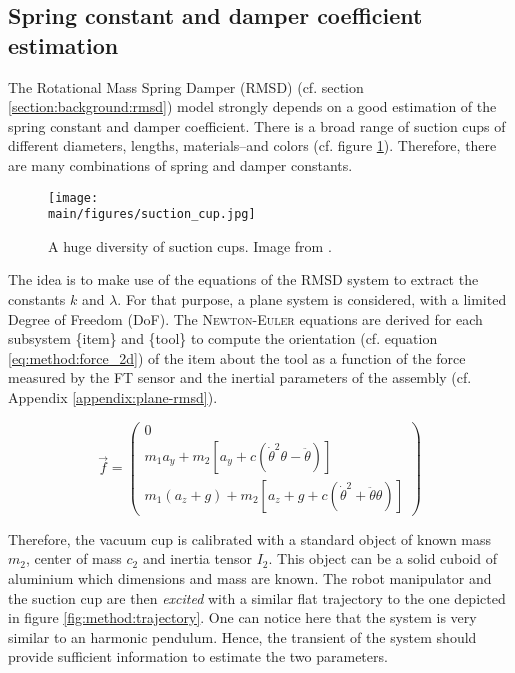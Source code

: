 \documentclass[/home/francois/latex/report/main.tex]{subfiles}
\begin{document}
\subsection{Spring constant and damper coefficient estimation}

The Rotational Mass Spring Damper (RMSD) (cf. section \ref{section:background:rmsd}) model strongly depends on a good estimation of the spring constant and damper coefficient. There is a broad range of suction cups of different diameters, lengths, materials–and colors (cf. figure \ref{fig:method:suction-cups}). Therefore, there are many combinations of spring and damper constants.

\begin{figure}[H]
  \centering
  \texttt{[image: \\main/figures/suction\_cup.jpg]}
  \caption{A huge diversity of suction cups. Image from \cite{Piab2020}.}
  \label{fig:method:suction-cups}
\end{figure}

The idea is to make use of the equations of the \ac{RMSD} system to extract the constants $k$ and $\lambda$. For that purpose, a plane system is considered, with a limited Degree of Freedom (DoF). The \textsc{Newton-Euler} equations are derived for each subsystem \{item\} and \{tool\} to compute the orientation (cf. equation \ref{eq:method:force_2d}) of the item about the tool as a function of the force measured by the \ac{FT} sensor and the inertial parameters of the assembly (cf. Appendix \ref{appendix:plane-rmsd}).

\begin{equation}
  \label{eq:method:force_2d}
  \overrightarrow{f}
  =
  \begin{pmatrix}
  0 \\
  m_1 a_y + m_2 [a_y + c (\dot{\theta}^2 \theta - \ddot{\theta})] \\
  m_1 (a_z + g) + m_2 [a_z + g + c (\dot{\theta}^2 + \ddot{\theta} \theta)]
  \end{pmatrix}
\end{equation}

Therefore, the vacuum cup is calibrated with a standard object of known mass $m_2$, center of mass $c_2$ and inertia tensor $I_2$. This object can be a solid cuboid of aluminium which dimensions and mass are known. The robot manipulator and the suction cup are then \textit{excited} with a similar flat trajectory to the one depicted in figure \ref{fig:method:trajectory}. One can notice here that the system is very similar to an harmonic pendulum. Hence, the transient of the system should provide sufficient information to estimate the two parameters.
\end{document}
